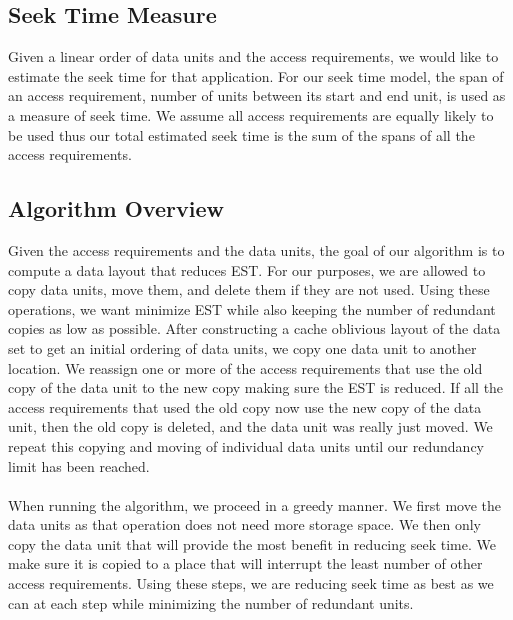 \subsection{Seek Time Measure}

Given a linear order of data units and the access requirements, we would like to
estimate the seek time for that application.  For our seek time model, the
span of an access requirement, number of units between its start and end unit, is used as a measure of seek time.
 We assume all access requirements are equally likely to be used thus 
our total estimated seek time is the sum of the spans of all the access requirements. 


\subsection{Algorithm Overview}

Given the access requirements and the data units, the goal of our algorithm is to compute a data layout that reduces EST.  For our purposes, we are allowed to copy data units, move them, and
delete them if they are not used. Using these operations, we want minimize EST
while also keeping the number of redundant copies as low as possible. After constructing a cache oblivious layout 
of the data set to get an initial ordering of data units, we copy one data unit
to another location. We reassign one or more of the access requirements that
use the old copy of the data unit to the new copy making sure the EST is
reduced.  If all the access requirements that used the old copy now use the
new copy of the data unit, then the old copy is deleted, and the data unit was really just moved.  We repeat this
copying and moving of individual data units until our redundancy
limit has been reached. \\
\\
When running the algorithm, we proceed in a greedy manner. We first move the data units as that operation does not need more storage space. We then only copy the data unit that will provide the most benefit in reducing seek time. We make sure it is copied to a place that will interrupt the least number of other access requirements. Using these steps, we are reducing seek time as best as we can at each step while minimizing the number of redundant units.
